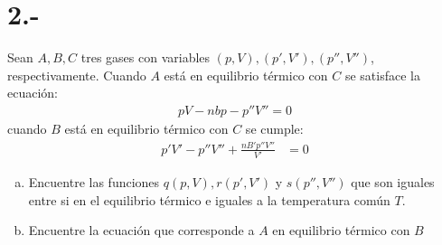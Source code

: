 \documentclass{article}
\begin{document}
\section*{2.-}
Sean $A,B,C$ tres gases con variables $(p,V),(p',V'),(p'',V'')$, respectivamente. 
Cuando $A$ está en equilibrio térmico con $C$ se satisface la ecuación:
\begin{align*}
    pV - nbp - p''V'' = 0
\end{align*}
cuando $B$ está en equilibrio térmico con $C$ se cumple:
\begin{align*}
    p'V' - p''V'' + \frac{nB'p''V''}{V'} &= 0
\end{align*}
\begin{enumerate}[a)]
    \item Encuentre las funciones $q(p,V),r(p',V')$ y $s(p'',V'')$ que son iguales 
    entre si en el equilibrio térmico e iguales a la temperatura común $T$.

    \item Encuentre la ecuación que corresponde a $A$ en equilibrio térmico con $B$
\end{enumerate}
\end{document}
